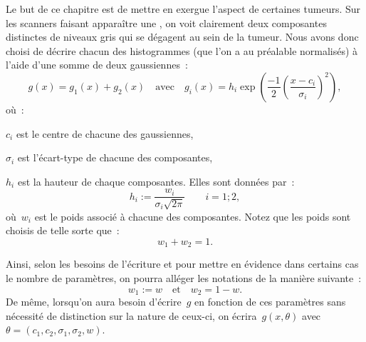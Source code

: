 \documentclass[main.tex]{subfiles}
\begin{document}
Le but de ce chapitre est de mettre en exergue l'aspect \heterogene de certaines tumeurs. Sur les scanners %
faisant apparaître une \hetero, 
on voit clairement deux composantes distinctes de niveaux gris qui se dégagent au sein de la tumeur. Nous avons donc choisi de décrire chacun des histogrammes (que l'on a au préalable normalisés) à l'aide d'une somme de deux gaussiennes~:
\begin{equation}
\label{eq:decomp_gaussienne}
g(x) = g_1(x)+g_2(x) \quad \textrm{avec} \quad g_i(x) = h_i\exp \left(\frac{-1}{2} \left( \dfrac{x-c_i}{\sigma_i}\right)^2  \right),
\end{equation}
où~:
\begin{myitemize}
\item $c_i$ est le centre de chacune des gaussiennes,
\item $\sigma_i$ est l'écart-type de chacune des composantes,
\item $h_i$ est la hauteur de chaque composantes. Elles sont données par~:
\begin{equation}
\label{eq:hauteur_gaussienne}
h_i := \dfrac{w_i}{\sigma_i \sqrt{2\pi}} \qquad i=1;2,
\end{equation}
où~$w_i$ est le poids associé à chacune des composantes. Notez que les poids sont choisis de telle sorte que~:
\begin{equation}
w_1+w_2=1.
\end{equation}
\end{myitemize}
Ainsi, selon les besoins de l'écriture et pour mettre en évidence dans certains cas le nombre de paramètres, on pourra alléger les notations de la manière suivante~:
\begin{equation}
\label{eq:renomage_w}
w_1 := w \quad \textrm{et} \quad w_2 = 1 - w.
\end{equation}
De même, lorsqu'on aura besoin d'écrire~$g$ en fonction de ces paramètres sans nécessité de distinction sur la nature de ceux-ci, on écrira~$g(x,\theta)$ avec~$\theta =( c_1,c_2,\sigma_1,\sigma_2,w  )$.
\end{document}
